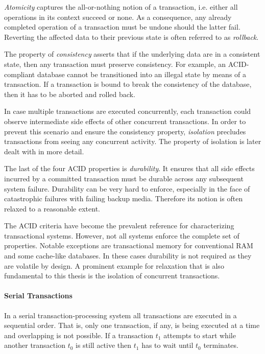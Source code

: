 \emph{Atomicity} captures the all-or-nothing notion of a transaction, i.e.
either all operations in its context succeed or none. As a consequence, any
already completed operation of a transaction must be undone should the latter
fail. Reverting the affected data to their previous state is often referred to
as \emph{rollback}.

The property of \emph{consistency} asserts that if the underlying data are in a
consistent state, then any transaction must preserve consistency. For example,
an ACID-compliant database cannot be transitioned into an illegal state by means
of a transaction. If  a transaction is bound to break the consistency of the
database, then it has to be aborted and rolled back.

In case multiple transactions are executed concurrently, each transaction could
observe intermediate side effects of other concurrent transactions. In order to
prevent this scenario and ensure the consistency property, \emph{isolation}
precludes transactions from seeing any concurrent activity. The property of
isolation is later dealt with in more detail.

The last of the four ACID properties is \emph{durability}. It ensures that all
side effects incurred by a committed transaction must be durable across any
subsequent system failure. Durability can be very hard to enforce, especially in
the face of catastrophic failures with failing backup media. Therefore its notion
is often relaxed to a reasonable extent.

The ACID criteria have become the prevalent reference for characterizing
transactional systems. However, not all systems enforce the complete set of
properties. Notable exceptions are transactional memory for conventional
\ac{RAM} and some cache-like databases. In these cases durability is not
required as they are volatile by design. A prominent example for relaxation that
is also fundamental to this thesis is the isolation of concurrent transactions.

\paragraph{Serial Transactions}

In a serial transaction-processing system all transactions are executed in a
sequential order. That is, only one transaction, if any, is being executed at a
time and overlapping is not possible. If a transaction $t_1$ attempts to start
while another transaction $t_0$ is still active then $t_1$ has to wait until
$t_0$ terminates.

